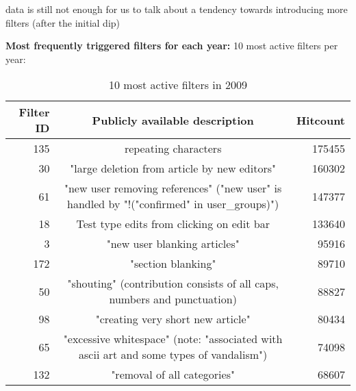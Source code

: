 data is still not enough for us to talk about a tendency towards introducing more filters (after the initial dip)

\begin{comment}
\url{https://en.wikipedia.org/wiki/Wikipedia:Edit_filter/Requested}
"Each filter takes time to run, making editing (and to some extent other things) slightly slower. The time is only a few milliseconds per filter, but with enough filters that adds up. When the system is near its limit, adding a new filter may require removing another filter in order to keep the system within its limits."
\end{comment}

\textbf{Most frequently triggered filters for each year:}
10 most active filters per year:
\begin{table}
  \centering
  \begin{tabular}{r c r }
    Filter ID & Publicly available description & Hitcount \\ %
    \hline
    135 & repeating characters & 175455 \\
    30 & "large deletion from article by new editors" & 160302 \\
    61 & "new user removing references" ("new user" is handled by "!("confirmed" in user\_groups)") & 147377 \\
    18 & Test type edits from clicking on edit bar & 133640 \\
    3 & "new user blanking articles" & 95916 \\
    172 & "section blanking" & 89710 \\
    50 & "shouting" (contribution consists of all caps, numbers and punctuation) & 88827 \\
    98 & "creating very short new article" & 80434 \\
    65 & "excessive whitespace" (note: "associated with ascii art and some types of vandalism") & 74098 \\
    132 & "removal of all categories" & 68607 \\
  \end{tabular}
  \caption{10 most active filters in 2009}~\label{tab:most-active-2009}
\end{table}

